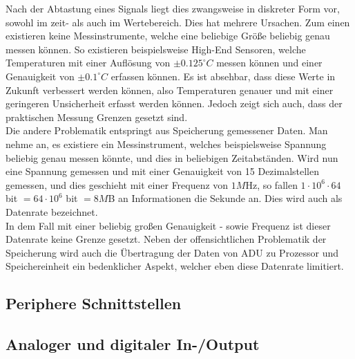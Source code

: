 Nach der Abtastung eines Signals liegt dies zwangsweise in diskreter Form vor, sowohl im zeit- als auch im Wertebereich. Dies hat mehrere Ursachen. Zum einen existieren keine Messinstrumente, welche eine beliebige Größe beliebig genau messen können. So existieren beispielsweise High-End Sensoren, welche Temperaturen mit einer Auflösung von $\pm0.125^\circ C$ messen können und einer Genauigkeit von $\pm0.1^\circ C$ erfassen können. Es ist absehbar, dass diese Werte in Zukunft verbessert werden können, also Temperaturen genauer und mit einer geringeren Unsicherheit erfasst werden können. Jedoch zeigt sich auch, dass der praktischen Messung Grenzen gesetzt sind.\\
Die andere Problematik entspringt aus Speicherung gemessener Daten. Man nehme an, es existiere ein Messinstrument, welches beispielsweise Spannung beliebig genau messen könnte, und dies in beliebigen Zeitabständen. Wird nun eine Spannung gemessen und mit einer Genauigkeit von 15 Dezimalstellen gemessen, und dies geschieht mit einer Frequenz von $1M$Hz, so fallen $1 \cdot 10^6 \cdot 64$ bit $= 64 \cdot 10^6$ bit $= 8M$B an Informationen die Sekunde an. Dies wird auch als Datenrate bezeichnet.\\
In dem Fall mit einer beliebig großen Genauigkeit - sowie Frequenz ist dieser Datenrate keine Grenze gesetzt. Neben der offensichtlichen Problematik der Speicherung wird auch die Übertragung der Daten von ADU zu Prozessor und Speichereinheit ein bedenklicher Aspekt, welcher eben diese Datenrate limitiert.

\subsection{Periphere Schnittstellen}\label{3.4}
\subsection{Analoger und digitaler In-/Output}\label{3.5}